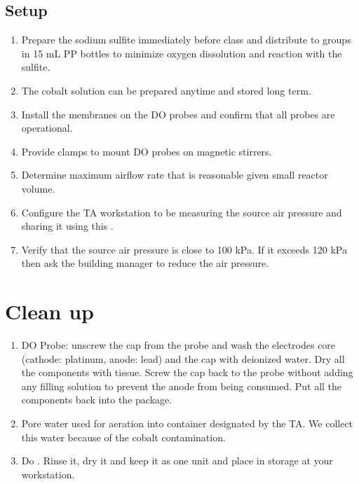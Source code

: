 \documentclass[letterpaper,10pt,english]{sphinxmanual}
\begin{document}
\subsection{Setup}
\label{\detokenize{Gas_Transfer/Gas_Transfer:setup}}\begin{enumerate}
\item {} 
Prepare the sodium sulfite immediately before class and distribute to groups in 15 mL PP bottles to minimize oxygen dissolution and reaction with the sulfite.

\item {} 
The cobalt solution can be prepared anytime and stored long term.

\item {} 
Install the membranes on the DO probes and confirm that all probes are operational.

\item {} 
Provide clamps to mount DO probes on magnetic stirrers.

\item {} 
Determine maximum airflow rate that is reasonable given small reactor volume.

\item {} 
Configure the TA workstation to be measuring the source air pressure and sharing it using this .

\item {} 
Verify that the source air pressure is close to 100 kPa. If it exceeds 120 kPa then ask the building manager to reduce the air pressure.

\end{enumerate}


\section{Clean up}
\label{\detokenize{Gas_Transfer/Gas_Transfer:clean-up}}\begin{enumerate}
\item {} 
DO Probe: unscrew the cap from the probe and wash the electrodes core (cathode: platinum, anode: lead) and the cap with deionized water. Dry all the components with tissue. Screw the cap back to the probe without adding any filling solution to prevent the anode from being consumed. Put all the components back into the package.

\item {} 
Pore water used for aeration into container designated by the TA. We collect this water because of the cobalt contamination.

\item {} 
Do . Rinse it, dry it and keep it as one unit and place in storage at your workstation.

\end{enumerate}
\end{document}
